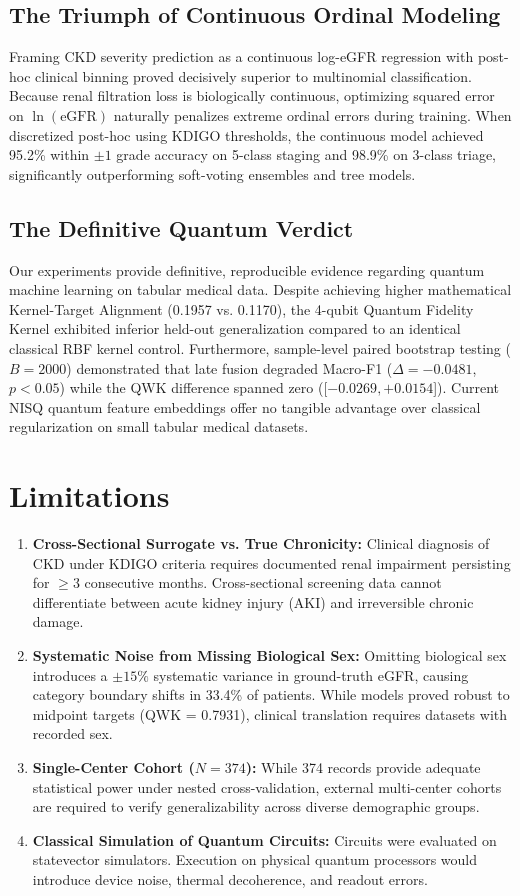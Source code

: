 \documentclass[conference]{IEEEtran}
\begin{document}
\subsection{The Triumph of Continuous Ordinal Modeling}
Framing CKD severity prediction as a continuous log-eGFR regression with post-hoc clinical binning proved decisively superior to multinomial classification. Because renal filtration loss is biologically continuous, optimizing squared error on $\ln(\text{eGFR})$ naturally penalizes extreme ordinal errors during training. When discretized post-hoc using KDIGO thresholds, the continuous model achieved 95.2\% within $\pm 1$ grade accuracy on 5-class staging and 98.9\% on 3-class triage, significantly outperforming soft-voting ensembles and tree models.

\subsection{The Definitive Quantum Verdict}
Our experiments provide definitive, reproducible evidence regarding quantum machine learning on tabular medical data. Despite achieving higher mathematical Kernel-Target Alignment (0.1957 vs. 0.1170), the 4-qubit Quantum Fidelity Kernel exhibited inferior held-out generalization compared to an identical classical RBF kernel control. Furthermore, sample-level paired bootstrap testing ($B = 2000$) demonstrated that late fusion degraded Macro-F1 ($\Delta = -0.0481$, $p < 0.05$) while the QWK difference spanned zero ([$-0.0269, +0.0154$]). Current NISQ quantum feature embeddings offer no tangible advantage over classical regularization on small tabular medical datasets.

\section{Limitations}

\begin{enumerate}
    \item \textbf{Cross-Sectional Surrogate vs. True Chronicity:} Clinical diagnosis of CKD under KDIGO criteria requires documented renal impairment persisting for $\ge 3$ consecutive months. Cross-sectional screening data cannot differentiate between acute kidney injury (AKI) and irreversible chronic damage.
    \item \textbf{Systematic Noise from Missing Biological Sex:} Omitting biological sex introduces a $\pm 15\%$ systematic variance in ground-truth eGFR, causing category boundary shifts in 33.4\% of patients. While models proved robust to midpoint targets (QWK = 0.7931), clinical translation requires datasets with recorded sex.
    \item \textbf{Single-Center Cohort ($N = 374$):} While 374 records provide adequate statistical power under nested cross-validation, external multi-center cohorts are required to verify generalizability across diverse demographic groups.
    \item \textbf{Classical Simulation of Quantum Circuits:} Circuits were evaluated on statevector simulators. Execution on physical quantum processors would introduce device noise, thermal decoherence, and readout errors.
\end{enumerate}
\end{document}
